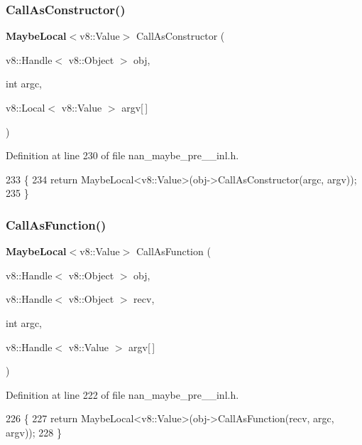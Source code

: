 \subsubsection{Call\+As\+Constructor()}
{\footnotesize\ttfamily \textbf{ Maybe\+Local}$<$v8\+::\+Value$>$ Call\+As\+Constructor (\begin{DoxyParamCaption}\item[{v8\+::\+Handle$<$ v8\+::\+Object $>$}]{obj,  }\item[{int}]{argc,  }\item[{v8\+::\+Local$<$ v8\+::\+Value $>$}]{argv[$\,$] }\end{DoxyParamCaption})}



Definition at line 230 of file nan\+\_\+maybe\+\_\+pre\+\_\+\_\+inl.\+h.


\begin{DoxyCode}
233                              \{
234   \textcolor{keywordflow}{return} MaybeLocal<v8::Value>(obj->CallAsConstructor(argc, argv));
235 \}
\end{DoxyCode}
\mbox{\label{nan__maybe__pre__43__inl_8h_a8ebee52126ebffe8993d6a9be8ff8a4c}} 
\subsubsection{Call\+As\+Function()}
{\footnotesize\ttfamily \textbf{ Maybe\+Local}$<$v8\+::\+Value$>$ Call\+As\+Function (\begin{DoxyParamCaption}\item[{v8\+::\+Handle$<$ v8\+::\+Object $>$}]{obj,  }\item[{v8\+::\+Handle$<$ v8\+::\+Object $>$}]{recv,  }\item[{int}]{argc,  }\item[{v8\+::\+Handle$<$ v8\+::\+Value $>$}]{argv[$\,$] }\end{DoxyParamCaption})}



Definition at line 222 of file nan\+\_\+maybe\+\_\+pre\+\_\+\_\+inl.\+h.


\begin{DoxyCode}
226                               \{
227   \textcolor{keywordflow}{return} MaybeLocal<v8::Value>(obj->CallAsFunction(recv, argc, argv));
228 \}
\end{DoxyCode}
\mbox{\label{nan__maybe__pre__43__inl_8h_a3ad6deb9065d99407d4be90208bddc0e}} 
